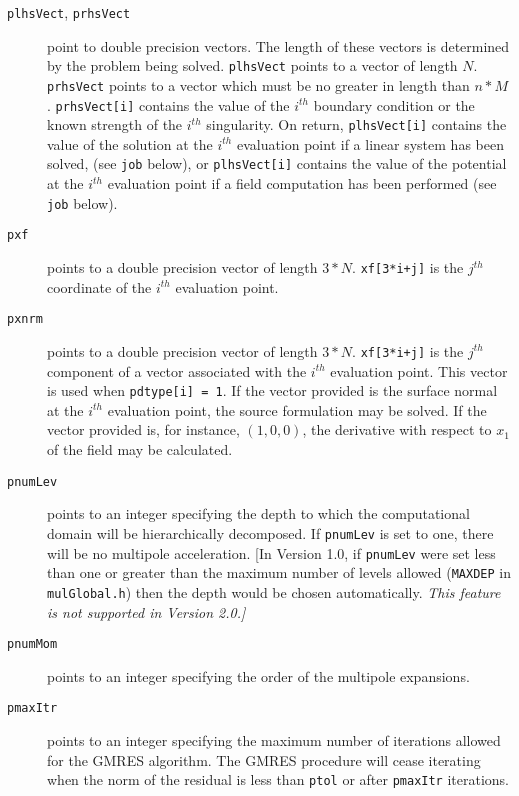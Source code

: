 \begin{description}
\item[{\tt plhsVect}, {\tt prhsVect}] point to double precision 
vectors.  The length of these vectors is determined by the problem 
being solved. {\tt plhsVect} points to a vector of length $N$.  
{\tt prhsVect} points to a vector which must 
be no greater in length than $n*M$.  {\tt prhsVect[i]} contains the value of
the  $i^{th}$ boundary condition or the known strength of the $i^{th}$ 
singularity.  On return,  {\tt plhsVect[i]} contains the value of the 
solution at the $i^{th}$ evaluation point if a linear system has been solved,
(see {\tt job} below), or {\tt plhsVect[i]} contains the value of
the potential at the $i^{th}$ evaluation point if a field computation has
been performed (see {\tt job} below).  

\item[{\tt pxf}] points to a double precision vector of length $3*N$.
{\tt xf[3*i+j]} is the $j^{th}$ coordinate of the  $i^{th}$ 
evaluation point.  

\item[{\tt pxnrm}] points to a double precision vector of length $3*N$.
{\tt xf[3*i+j]} is the $j^{th}$ component of a vector associated
with the $i^{th}$ evaluation point.  This vector is used when 
{\tt pdtype[i] = 1}.  If the vector provided is the surface normal at
the  $i^{th}$ evaluation point, the source formulation may be solved.
If  the vector provided is, for instance, $(1,0,0)$, the derivative
with respect to $x_1$ of the field may be calculated. 

\item[{\tt pnumLev}] points to an integer specifying the depth to which the
computational domain will be hierarchically decomposed.
If {\tt *pnumLev} is set to one, there will be no multipole acceleration.
[In Version 1.0, if {\tt *pnumLev} were set less than one or greater than 
the maximum number of levels allowed ({\tt MAXDEP} in {\tt mulGlobal.h}) 
then the depth would be chosen automatically. \it This feature is not
supported in Version 2.0.\rm]

\item[{\tt pnumMom}] points to an integer specifying the order of the
multipole expansions.

\item[{\tt pmaxItr}] points to an integer specifying the maximum number of
iterations allowed for the GMRES algorithm. The GMRES
procedure will cease iterating when the norm of the residual is less
than {\tt *ptol} or after {\tt *pmaxItr} iterations.


\end{description}
